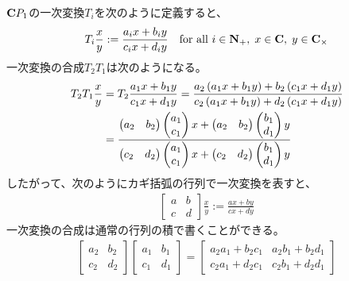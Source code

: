 {	$\mathbf{C} P_1$の一次変換$T_i$を次のように定義すると、
	\begin{equation*}\begin{split}
		T_i\frac{x}{y} := \frac{a_ix + b_iy}{c_ix + d_iy}
		\quad\text{for all } i\in\mathbf{N}_+,\; x\in\mathbf{C},\; y\in\mathbf{C}_\times
	\end{split}\end{equation*}
	一次変換の合成$T_2T_1$は次のようになる。
	\begin{equation*}\begin{split}
		T_2T_1\frac{x}{y} &= T_2\frac{a_1x + b_1y}{c_1x + d_1y}
		= \frac{a_2\mathinner{\left({a_1x + b_1y}\right)} + b_2\mathinner{\left({c_1x + d_1y}\right)}}
			{c_2\mathinner{\left({a_1x + b_1y}\right)} + d_2\mathinner{\left({c_1x + d_1y}\right)}} \\
		&= \frac{\begin{pmatrix}{a_2}&{b_2}\end{pmatrix}\begin{pmatrix}{a_1}\\{c_1}\end{pmatrix}x
			+ \begin{pmatrix}{a_2}&{b_2}\end{pmatrix}\begin{pmatrix}{b_1}\\{d_1}\end{pmatrix}y}{\begin{pmatrix}{c_2}&{d_2}\end{pmatrix}\begin{pmatrix}{a_1}\\{c_1}\end{pmatrix}x
			+ \begin{pmatrix}{c_2}&{d_2}\end{pmatrix}\begin{pmatrix}{b_1}\\{d_1}\end{pmatrix}y}
	\end{split}\end{equation*}
	したがって、次のようにカギ括弧の行列で一次変換を表すと、
	\begin{equation*}\begin{split}
		\begin{bmatrix}
			a & b \\ c & d
		\end{bmatrix}\frac{x}{y} := \frac{ax + by}{cx + dy}
	\end{split}\end{equation*}
	一次変換の合成は通常の行列の積で書くことができる。
	\begin{equation*}\begin{split}
		\begin{bmatrix}
			a_2 & b_2 \\ c_2 & d_2
		\end{bmatrix}\begin{bmatrix}
			a_1 & b_1 \\ c_1 & d_1
		\end{bmatrix} = \begin{bmatrix}
			a_2a_1 + b_2c_1 & a_2b_1 + b_2d_1 \\ c_2a_1 + d_2c_1 
			& c_2b_1 + d_2d_1
		\end{bmatrix}
	\end{split}\end{equation*}

}
